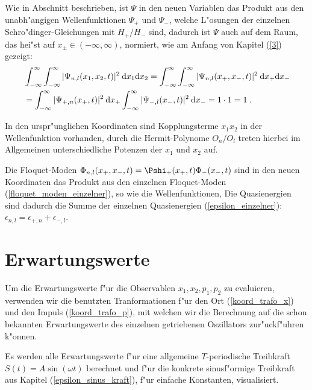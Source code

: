   Wie in Abschnitt  beschrieben, ist $\Psi$ in den neuen Variablen das Produkt aus den unabh"angigen Wellenfunktionen $\Psi_+$ und $\Psi_-$, welche L"osungen der einzelnen Schro"dinger-Gleichungen mit $H_+/H_-$ sind, dadurch ist $\Psi$ auch auf dem Raum, das hei"st auf $x_\pm \in (-\infty,\infty)$, normiert, wie am Anfang von Kapitel (\ref{3}) gezeigt:
  \begin{align}
    &\int_{-\infty}^{\infty}\int_{-\infty}^{\infty} |\Psi_{n,l}(x_1,x_2,t)|^2 \: \text dx_1\text dx_2
    =\int_{-\infty}^{\infty}\int_{-\infty}^{\infty} |\Psi_{n,l}(x_+,x_-,t)|^2 \: \text dx_+\text dx_- \notag\\
    &=\int_{-\infty}^{\infty} |\Psi_{+,n}(x_+,t)|^2 \: \text dx_+ \int_{-\infty}^{\infty} |\Psi_{-,l}(x_-,t)|^2 \: \text dx_-
    = 1 \cdot 1 = 1 \; .
    \label{norm_gekoppelt}
  \end{align}

  In den urspr"unglichen Koordinaten sind Kopplungsterme $x_1x_2$ in der Wellenfunktion vorhanden, durch die Hermit-Polynome $O_n/O_l$ treten hierbei im Allgemeinen unterschiedliche Potenzen der $x_1$ und $x_2$ auf.

  Die Floquet-Moden $\Phi_{n,l}(x_+,x_-,t)=\Pshi_+(x_+,t)\Phi_-(x_-,t)$ sind in den neuen Koordinaten das Produkt aus den einzelnen Floquet-Moden (\ref{floquet_moden_einzelner}), so wie die Wellenfunktionen,
  Die Quasienergien sind dadurch die Summe der einzelnen Quasienergien (\ref{epsilon_einzelner}): $\epsilon_{n,l}=\epsilon_{+,n}+\epsilon_{-,l}$.


\section{Erwartungswerte}
  \label{erwartungswerte_gekoppelt}
  Um die Erwartungswerte f"ur die Observablen $x_1,x_2,p_1,p_2$ zu evaluieren, verwenden wir die benutzten Tranformationen f"ur den Ort (\ref{koord_trafo_x}) und den Impuls (\ref{koord_trafo_p}), mit welchen wir die Berechnung auf die schon bekannten Erwartungswerte des einzelnen getriebenen Oszillators zur"uckf"uhren k"onnen.

  Es werden alle Erwartungswerte f"ur eine allgemeine $T$-periodische Treibkraft $S(t)=A\sin(\omega t)$ berechnet und f"ur die konkrete sinusf"ormige Treibkraft aus Kapitel (\ref{epsilon_sinus_kraft}), f"ur einfache Konstanten, visualisiert.


